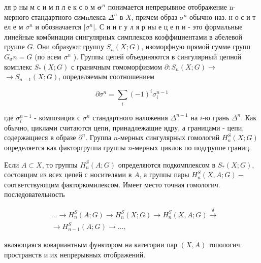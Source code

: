 \documentclass[10pt]{article}
\begin{document}
ля р ны м с и м п л е к с о м $\boldsymbol{\sigma}^{n}$ понимается непрерывное отображение n-мерного стандартного симnлекса $\Delta^{n}$ в $X$, причем образ $\sigma^{n}$ обычно наз. н о с и т ел е м $\sigma^{n}$ и обозначается $\left|\sigma^{n}\right|$. С и н г у л я р ны е ц е п и - это формальные линейные комбинации сингулярных симплексов коэффициентами в абелевой группе $G$. Они образуют группу $S_{n}(X ; G)$, изоморфную прямой сумме групп $G_{\sigma} n=G$ (по всем $\sigma^{n}$ ). Группы цепей объединяются в сингулярный цепной комплекс $S_{*}(X ; G)$ с граничным гомоморфизмом $\partial: S_{n}(X ; G) \rightarrow$ $\rightarrow S_{n-1}(X ; G)$, определяемым соотношением



\[

\partial \sigma^{n}=\sum_{i}(-1)^{i} \sigma_{i}^{n-1}

\]



где $\sigma_{i}^{n-1}$ - композиция с $\sigma^{n}$ стандартного наложения $\Delta^{n-1}$ на $i$-ю грань $\Delta^{n}$. Как обычно, циклами считаются цепи, принадлежащие ядру, а границами - цепи, содержащиеся в образе $\partial^{n}$. Группа $n$-мерных сингулярных гомологий $H_{n}^{S}(X ; G)$ определяется как факторгруппа группы $n$-мерных циклов по подгруппе границ.



Если $A \subset X$, то группы $H_{n}^{S}(A ; G)$ определяются подкомплексом в $S_{*}(X ; G)$, состоящим из всех цепей с носителями в $A$, а группы пары $H_{n}^{S}(X, A ; G)-$ соответствующим факторкомилексом. Имеет место точная гомологич. последовательность



\[

\begin{aligned}

& \ldots \longrightarrow H_{n}^{S}(A ; G) \longrightarrow H_{n}^{S}(X ; G) \longrightarrow H_{n}^{S}(X, A ; G) \stackrel{\delta}{\longrightarrow} \\

& \longrightarrow H_{n-1}^{S}(A ; G) \longrightarrow \ldots \text {, }

\end{aligned}

\]



являющаяся ковариантным функтором на категории пар $(X, A)$ топологич. пространств и их непрерывных отображений.
\end{document}
